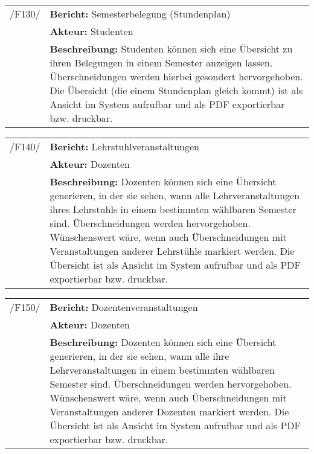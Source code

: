 \begin{tabular}{p{1.5cm}p{14.5cm}}
	
	 /F130/& \textbf{Bericht:} Semesterbelegung (Stundenplan) \\
				& \textbf{Akteur:} Studenten \\
				& \textbf{Beschreibung:} Studenten können sich eine Übersicht zu ihren Belegungen in einem Semester anzeigen lassen. Überschneidungen werden hierbei gesondert hervorgehoben. Die Übersicht (die einem Stundenplan gleich kommt) ist als Ansicht im System aufrufbar und als PDF exportierbar bzw. druckbar. \\[0.25cm]

				
\end{tabular}


\begin{tabular}{p{1.5cm}p{14.5cm}}
	
	 /F140/& \textbf{Bericht:} Lehrstuhlveranstaltungen \\
				& \textbf{Akteur:} Dozenten \\
				& \textbf{Beschreibung:} Dozenten können sich eine Übersicht generieren, in der sie sehen, wann alle Lehrveranstaltungen ihres Lehrstuhls in einem bestimmten wählbaren Semester sind. Überschneidungen werden hervorgehoben. Wünschenswert wäre, wenn auch Überschneidungen mit Veranstaltungen anderer Lehrstühle markiert werden. Die Übersicht ist als Ansicht im System aufrufbar und als PDF exportierbar bzw. druckbar. \\[0.25cm]

				
\end{tabular}


\begin{tabular}{p{1.5cm}p{14.5cm}}
	
	 /F150/& \textbf{Bericht:} Dozentenveranstaltungen \\
				& \textbf{Akteur:} Dozenten \\
				& \textbf{Beschreibung:} Dozenten können sich eine Übersicht generieren, in der sie sehen, wann alle ihre Lehrveranstaltungen in einem bestimmten wählbaren Semester sind. Überschneidungen werden hervorgehoben. Wünschenswert wäre, wenn auch Überschneidungen mit Veranstaltungen anderer Dozenten markiert werden. Die Übersicht ist als Ansicht im System aufrufbar und als PDF exportierbar bzw. druckbar. \\[0.25cm]

				
\end{tabular}